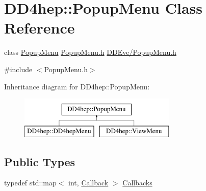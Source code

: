 \hypertarget{class_d_d4hep_1_1_popup_menu}{}\section{D\+D4hep\+:\+:Popup\+Menu Class Reference}
\label{class_d_d4hep_1_1_popup_menu}


class \hyperlink{class_d_d4hep_1_1_popup_menu}{Popup\+Menu} \hyperlink{_popup_menu_8h}{Popup\+Menu.\+h} \hyperlink{_popup_menu_8h}{D\+D\+Eve/\+Popup\+Menu.\+h}  




{\ttfamily \#include $<$Popup\+Menu.\+h$>$}

Inheritance diagram for D\+D4hep\+:\+:Popup\+Menu\+:\begin{figure}[H]
\begin{center}
\leavevmode
\includegraphics[height=2.000000cm]{class_d_d4hep_1_1_popup_menu}
\end{center}
\end{figure}
\subsection*{Public Types}
\begin{DoxyCompactItemize}
\item 
typedef std\+::map$<$ int, \hyperlink{class_d_d4hep_1_1_callback}{Callback} $>$ \hyperlink{class_d_d4hep_1_1_popup_menu_aea53283ce44fa4935d8b7a3751ad1b5b}{Callbacks}
\end{DoxyCompactItemize}
